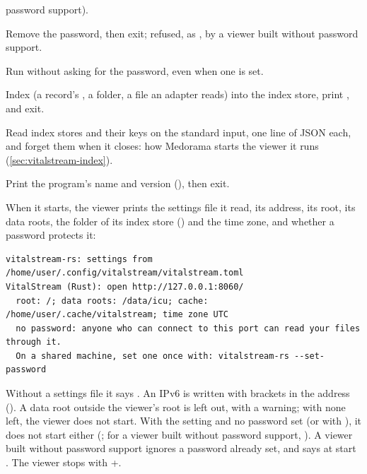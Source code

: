 \begin{params}
{  password support}).
\item[--clear-password] Remove the password, then exit; refused, as , by a
  viewer built without password support.
\item[--no-auth] Run without asking for the password, even when one is set.
\item[--index PATH] Index  (a record's , a folder, a file an adapter reads)
  into the index store, print , and exit.
\item[--keys-on-stdin] Read index stores and their keys on the standard input, one line of JSON
  each, and forget them when it closes: how Medorama starts the viewer it runs
  (\cref{sec:vitalstream-index}).
\item[-V, --version] Print the program's name and version (), then
  exit.
\end{params}

When it starts, the viewer prints the settings file it read, its address, its root, its data
roots, the folder of its index store () and the time zone, and whether a password protects it:

\begin{lstlisting}[style=text]
vitalstream-rs: settings from /home/user/.config/vitalstream/vitalstream.toml
VitalStream (Rust): open http://127.0.0.1:8060/
  root: /; data roots: /data/icu; cache: /home/user/.cache/vitalstream; time zone UTC
  no password: anyone who can connect to this port can read your files through it.
  On a shared machine, set one once with: vitalstream-rs --set-password
\end{lstlisting}

Without a settings file it says . An IPv6  is
written with brackets in the address (). A data root outside the
viewer's root is left out, with a warning; with none left, the viewer
does not start. With the setting  and no password set (or with
), it does not start either (; for a viewer built without password
support, ). A viewer built without password support ignores a password already
set, and says at start . The viewer stops with +.

